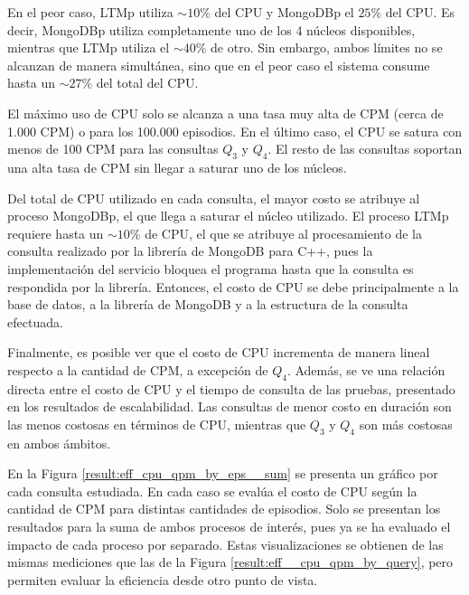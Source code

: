 En el peor caso, LTMp utiliza $\sim10\%$ del CPU y MongoDBp el $25\%$ del CPU. Es decir, MongoDBp utiliza completamente uno de los 4 núcleos disponibles, mientras que LTMp utiliza el $\sim40\%$ de otro. Sin embargo, ambos límites no se alcanzan de manera simultánea, sino que en el peor caso el sistema consume hasta un $\sim27\%$ del total del CPU. 

El máximo uso de CPU solo se alcanza a una tasa muy alta de CPM (cerca de 1.000 CPM) o para los 100.000 episodios. En el último caso, el CPU se satura con menos de 100 CPM para las consultas $Q_3$ y $Q_4$. El resto de las consultas soportan una alta tasa de CPM sin llegar a saturar uno de los núcleos.

Del total de CPU utilizado en cada consulta, el mayor costo se atribuye al proceso MongoDBp, el que llega a saturar el núcleo utilizado. El proceso LTMp requiere hasta un $\sim10\%$ de CPU, el que se atribuye al procesamiento de la consulta realizado por la librería de MongoDB para C++, pues la implementación del servicio bloquea el programa hasta que la consulta es respondida por la librería. Entonces, el costo de CPU se debe principalmente a la base de datos, a la librería de MongoDB y a la estructura de la consulta efectuada.

Finalmente, es posible ver que el costo de CPU incrementa de manera lineal  respecto a la cantidad de CPM, a excepción de $Q_4$. Además, se ve una relación directa entre el costo de CPU y el tiempo de consulta de las pruebas, presentado en los resultados de escalabilidad. Las consultas de menor costo en duración son las menos costosas en términos de CPU, mientras que $Q_3$ y $Q_4$ son más costosas en ambos ámbitos.



 En la Figura \ref{result:eff_cpu_qpm_by_eps__sum} se presenta un gráfico por cada consulta estudiada. En cada caso se evalúa el costo de CPU según la cantidad de CPM para distintas cantidades de episodios. Solo se presentan los resultados para la suma de ambos procesos de interés, pues ya se ha evaluado el impacto de cada proceso por separado. Estas visualizaciones se obtienen de las mismas mediciones que las de la Figura \ref{result:eff__cpu_qpm_by_query}, pero permiten evaluar la eficiencia desde otro punto de vista.


